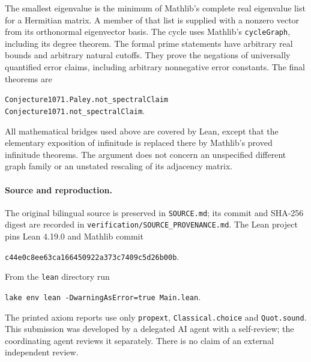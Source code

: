 \documentclass[11pt]{article}
\begin{document}
The smallest eigenvalue is the minimum of Mathlib's complete real
eigenvalue list for a Hermitian matrix. A member of that list is supplied
with a nonzero vector from its orthonormal eigenvector basis. The cycle
uses Mathlib's \texttt{cycleGraph}, including its degree theorem. The
formal prime statements have arbitrary real bounds and arbitrary natural
cutoffs. They prove the negations of universally quantified error claims,
including arbitrary nonnegative error constants. The final theorems are
\begin{center}\small
\texttt{Conjecture1071.Paley.not\_spectralClaim}\\
\texttt{Conjecture1071.not\_spectralClaim}.
\end{center}
All mathematical bridges used above are covered by Lean, except that the
elementary exposition of infinitude is replaced there by Mathlib's proved
infinitude theorems. The argument does not concern an unspecified different
graph family or an unstated rescaling of its adjacency matrix.

\paragraph{Source and reproduction.}
The original bilingual source is preserved in \texttt{SOURCE.md}; its
commit and SHA-256 digest are recorded in
\texttt{verification/SOURCE\_PROVENANCE.md}. The Lean project pins Lean
4.19.0 and Mathlib commit
\begin{center}\small\texttt{c44e0c8ee63ca166450922a373c7409c5d26b00b}.\end{center}
From the \texttt{lean} directory run
\begin{center}\small\texttt{lake env lean -DwarningAsError=true Main.lean}.\end{center}
The printed axiom reports use only \texttt{propext},
\texttt{Classical.choice} and \texttt{Quot.sound}.
This submission was developed by a delegated AI agent with a self-review;
the coordinating agent reviews it separately. There is no claim of an
external independent review.
\end{document}
